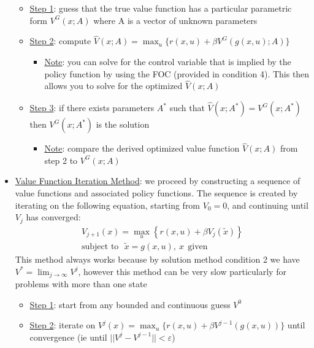 \documentclass{article}
\begin{document}
\begin{itemize}
        \begin{itemize}
            \item  \underline{Step 1}: guess that the true value function has a particular parametric form $V^{G}(x; A)$ where A is a vector of unknown parameters
            \item  \underline{Step 2}: compute $\widehat{V}(x;A) = \max_{u} \{r(x,u) + \beta V^{G}(g(x,u);A) \}$
            \begin{itemize}
                \item \underline{Note}: you can solve for the control variable that is implied by the policy function by using the FOC (provided in condition 4). This then allows you to solve for the optimized $\widehat{V}(x;A)$
            \end{itemize}
            \item  \underline{Step 3}: if there exists parameters $A^{*}$ such that $\widehat{V}(x; A^{*}) = V^{G}(x;A^{*})$ then $V^{G}(x;A^{*})$ is the solution
            \begin{itemize}
                \item \underline{Note}: compare the derived optimized value function $\widehat{V}(x;A)$ from step 2 to $V^{G}(x; A)$
            \end{itemize}
        \end{itemize}
    \item \underline{Value Function Iteration Method}: we proceed by constructing a sequence of value functions and associated policy functions. The sequence is created by iterating on the following equation, starting from $V_{0} = 0$, and continuing until $V_{j}$ has converged:
    \begin{gather*}
        V_{j+1}(x) = \max_{u} \left\{r(x,u) + \beta V_{j} (\widetilde{x}) \right\} \\
        \text{subject to} \ \ \ \widetilde{x} = g(x,u), \ x \ \ \text{given}
    \end{gather*}
     This method always works because by solution method condition 2 we have $V^{*} = \lim_{j \rightarrow \infty} V^{j}$, however this method can be very slow particularly for problems with more than one state
    \begin{itemize}
        \item  \underline{Step 1}: start from any bounded and continuous guess $V^{0}$
        \item  \underline{Step 2}: iterate on $V^{j}(x) = \max_{u} \{ r(x,u) + \beta V^{j−1} (g(x,u)) \}$ until convergence (ie until $||V^{j} − V^{j−1}|| < \varepsilon$)

\end{itemize}
\end{itemize}
\end{document}

